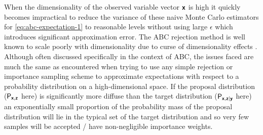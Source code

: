 When the dimensionality of the observed variable vector $\boldsymbol{\mathsf{x}}$ is high it quickly becomes impractical to reduce the variance of these naive Monte Carlo estimators for \eqref{eq:abc-expectation-1} to reasonable levels without using large $\epsilon$ which introduces significant approximation error. The \ac{ABC} rejection method is well known to scale poorly with dimensionality due to curse of dimensionality effects \citep{blum2010approximate,marin2012approximate,prangle2015summary}. Although often discussed specifically in the context of \ac{ABC}, the issues faced are much the same as encountered when trying to use any simple rejection or importance sampling scheme to approximate expectations with respect to a probability distribution on a high-dimensional space. If the proposal distribution ($\mathsf{P}_{\boldsymbol{\mathsf{x}},\boldsymbol{\mathsf{z}}}$ here) is significantly more diffuse than the target distribution ($\mathsf{P}_{\boldsymbol{\mathsf{x}},\boldsymbol{\mathsf{z}}|\boldsymbol{\mathsf{y}}}$ here) an exponentially small proportion of the probability mass of the proposal distribution will lie in the typical set of the target distribution and so very few samples will be accepted / have non-negligible importance weights.

